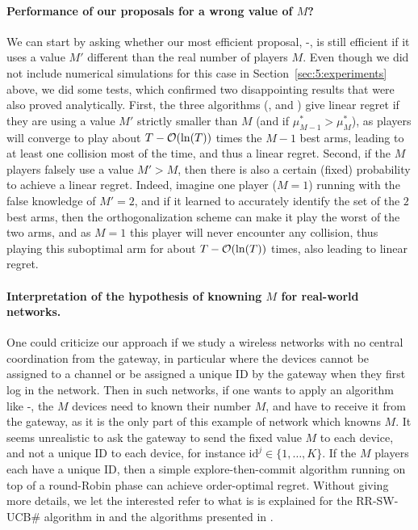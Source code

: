 \paragraph{Performance of our proposals for a wrong value of $M$?}
%
We can start by asking whether our most efficient proposal, \MCTopM-\klUCB, is still efficient if it uses a value $M'$ different than the real number of players $M$.
Even though we did not include numerical simulations for this case in Section~\ref{sec:5:experiments} above, we did some tests, which confirmed two disappointing results that were also proved analytically.
First, the three algorithms (\RhoRand, \RandTopM{} and \MCTopM) give linear regret if they are using a value $M'$ strictly smaller than $M$ (and if $\mu^*_{M-1} > \mu^*_M$), as players will converge to play about $T-\mathop{}\mathopen{}\mathcal{O}\mathopen{}\left(\ln(T)\right)$ times the $M-1$ best arms, leading to at least one collision most of the time, and thus a linear regret.
Second, if the $M$ players falsely use a value $M' > M$, then there is also a certain (fixed) probability to achieve a linear regret. Indeed, imagine one player ($M=1$) running \MCTopM{} with the false knowledge of $M'=2$, and if it learned to accurately identify the set of the $2$ best arms, then the \MCTopM{} orthogonalization scheme can make it play the worst of the two arms, and as $M=1$ this player will never encounter any collision, thus playing this suboptimal arm for about $T-\mathop{}\mathopen{}\mathcal{O}\mathopen{}\left(\ln(T)\right)$ times, also leading to linear regret.


\paragraph{Interpretation of the hypothesis of knowning $M$ for real-world networks.}
%
One could criticize our approach if we study a wireless networks with no central coordination from the gateway,
in particular where the devices cannot be assigned to a channel or be assigned a unique ID by the gateway when they first log in the network.
Then in such networks, if one wants to apply an algorithm like \MCTopM-\klUCB,
the $M$ devices need to known their number $M$, and have to receive it from the gateway, as it is the only part of this example of network which knowns $M$.
It seems unrealistic to ask the gateway to send the fixed value $M$ to each device, and not a unique ID to each device, for instance $\mathrm{id}^j\in\{1,\dots,K\}$.
%
If the $M$ players each have a unique ID, then a simple explore-then-commit algorithm running on top of a round-Robin phase can achieve order-optimal regret. Without giving more details, we let the interested refer to what is is explained for the RR-SW-UCB\# algorithm in \cite{WeiSrivastava18Distributed} and the algorithms presented in \cite{DarakHanawal18,JoshiKumar2018,KumarDarak2019}.


